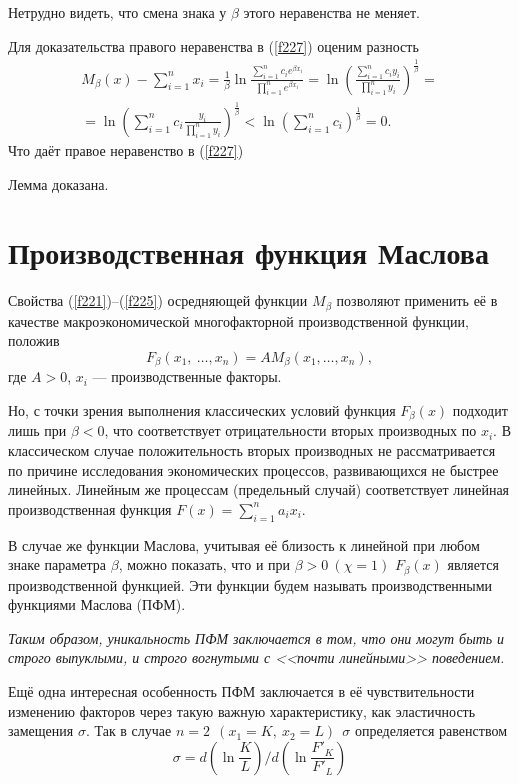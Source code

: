 \documentclass[12pt,openbib]{report}
\begin{document}
Нетрудно видеть, что смена знака у $\beta$ этого неравенства не меняет.

Для доказательства правого неравенства в (\ref{f227}) оценим разность
$$
\begin{array}{c}
M_\beta(x)-\sum\limits^n_{i=1} x_i =
\frac1\beta \ln \frac{\sum\limits^n_{i=1}
 c_i e^{\beta x_i}}{\prod\limits^n_{i=1}
 e^{\beta x_i}} = \ln \left( \frac{\sum\limits^n_{i=1} c_i y_i}{\prod\limits^n_{i=1} y_i}\right)^\frac1\beta=\\
 =\ln \left( \sum\limits^n_{i=1}c_i \frac {y_i} {\prod\limits^n_{i=1}y_i}\right)^\frac1\beta <
 \ln \left(\sum\limits^n_{i=1} c_i \right)^\frac1\beta = 0.
\end{array}
$$
Что даёт правое неравенство в (\ref{f227})

Лемма доказана.

\section{Производственная функция Маслова}

Свойства (\ref{f221})--(\ref{f225}) осредняющей функции $M_\beta$ позволяют
применить её в качестве макроэкономической многофакторной
производственной функции, положив
\begin{equation}\label{f231}
F_\beta (x_1, \ \ldots, x_n) = A M_\beta(x_1,\ldots, x_n), %
\end{equation}
где $A>0$, $x_i$ --- производственные факторы.

Но, с точки зрения выполнения классических условий функция $F_\beta(x)$ подходит лишь при $\beta<0$,
что соответствует отрицательности вторых производных по $x_i$.
В классическом случае положительность вторых производных не рассматривается по причине исследования экономических процессов,
развивающихся не быстрее линейных. Линейным же процессам (предельный случай) соответствует линейная производственная функция $F(x)=\sum\limits_{i=1}^n a_i x_i$.

В случае же функции Маслова, учитывая её близость к линейной при любом знаке параметра $\beta$, можно показать,
что и при $\beta>0 \ (\chi=1)$ $F_\beta(x)$ является производственной функцией. Эти функции будем называть производственными функциями Маслова (ПФМ).

{\it Таким образом, уникальность ПФМ заключается в том, что они
могут быть и строго выпуклыми, и строго вогнутыми с <<почти
линейными>> поведением.}

Ещё одна интересная особенность ПФМ заключается в её
чувствительности изменению факторов через такую важную
характеристику, как эластичность замещения $\sigma$. Так в случае
$n=2 \ \ (x_1=K, \ x_2=L) \ \ \sigma$ определяется равенством
\begin{equation}\label{f232}
\sigma=d(\ln \frac KL) / d(\ln \frac {F'_K}{F'_L}) %
\end{equation}
\end{document}
